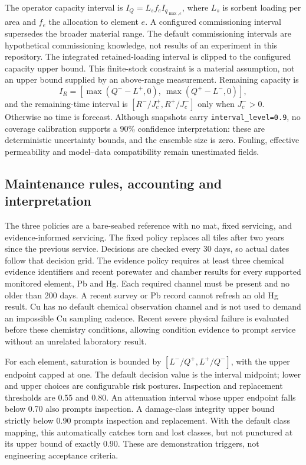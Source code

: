 The operator capacity interval is $I_Q=L_s f_e I_{q_{\max,e}}$, where $L_s$ is sorbent loading per area and $f_e$ the allocation to element $e$. A configured commissioning interval supersedes the broader material range. The default commissioning intervals are hypothetical commissioning knowledge, not results of an experiment in this repository. The integrated retained-loading interval is clipped to the configured capacity upper bound. This finite-stock constraint is a material assumption, not an upper bound supplied by an above-range measurement. Remaining capacity is
\begin{equation}
I_R=[\max(Q^- -L^+,0),\ \max(Q^+ -L^-,0)],
\end{equation}
and the remaining-time interval is $[R^-/J_c^+,R^+/J_c^-]$ only when $J_c^->0$. Otherwise no time is forecast. Although snapshots carry \texttt{interval\_level=0.9}, no coverage calibration supports a 90\% confidence interpretation: these are deterministic uncertainty bounds, and the ensemble size is zero. Fouling, effective permeability and model--data compatibility remain unestimated fields.

\subsection{Maintenance rules, accounting and interpretation}

The three policies are a bare-seabed reference with no mat, fixed servicing, and evidence-informed servicing. The fixed policy replaces all tiles after two years since the previous service. Decisions are checked every 30 days, so actual dates follow that decision grid. The evidence policy requires at least three chemical evidence identifiers and recent porewater and chamber results for every supported monitored element, Pb and Hg. Each required channel must be present and no older than 200 days. A recent survey or Pb record cannot refresh an old Hg result. Cu has no default chemical observation channel and is not used to demand an impossible Cu sampling cadence. Recent severe physical failure is evaluated before these chemistry conditions, allowing condition evidence to prompt service without an unrelated laboratory result.

For each element, saturation is bounded by $[L^-/Q^+,L^+/Q^-]$, with the upper endpoint capped at one. The default decision value is the interval midpoint; lower and upper choices are configurable risk postures. Inspection and replacement thresholds are 0.55 and 0.80. An attenuation interval whose upper endpoint falls below 0.70 also prompts inspection. A damage-class integrity upper bound strictly below 0.90 prompts inspection and replacement. With the default class mapping, this automatically catches torn and lost classes, but not punctured at its upper bound of exactly 0.90. These are demonstration triggers, not engineering acceptance criteria.

